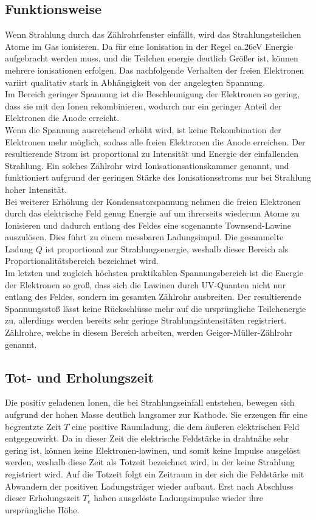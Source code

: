 \subsection{Funktionsweise}
Wenn Strahlung durch das Zählrohrfenster einfällt, wird das Strahlungsteilchen Atome im Gas ionisieren. Da für eine Ionisation in der Regel ca.26eV Energie aufgebracht werden muss, und die Teilchen energie deutlich Größer ist, können mehrere ionisationen erfolgen. Das nachfolgende Verhalten der freien Elektronen variirt qualitativ stark in Abhängigkeit von der angelegten Spannung. \\
Im Bereich geringer Spannung ist die Beschleunigung der Elektronen so gering, dass sie mit den Ionen rekombinieren, wodurch nur ein geringer Anteil der Elektronen die Anode erreicht.\\ Wenn die Spannung ausreichend erhöht wird, ist keine Rekombination der Elektronen mehr möglich, sodass alle freien Elektronen die Anode erreichen. Der resultierende Strom ist proportional zu Intensität und Energie der einfallenden Strahlung. Ein solches Zählrohr wird Ionisationsationskammer genannt, und funktioniert aufgrund der geringen Stärke des Ionisationsstroms nur bei Strahlung hoher Intensität. \\
Bei weiterer Erhöhung der Kondensatorspannung nehmen die freien Elektronen durch das elektrische Feld genug Energie auf um ihrerseits wiederum Atome zu Ionisieren und dadurch entlang des Feldes eine sogenannte Townsend-Lawine auszulösen. Dies führt zu einem messbaren Ladungsimpul. Die gesammelte Ladung $Q$ ist proportional zur Strahlungsenergie, weshalb dieser Bereich als Proportionalitätsbereich bezeichnet wird. \\ Im letzten und zugleich höchsten praktikablen Spannungsbereich ist die Energie der Elektronen so groß, dass sich die Lawinen durch UV-Quanten nicht nur entlang des Feldes, sondern im gesamten Zählrohr ausbreiten. Der resultierende Spannungsstoß lässt keine Rückschlüsse mehr auf die ursprüngliche Teilchenergie zu, allerdings werden bereits sehr geringe Strahlungsintensitäten registriert. Zählrohre, welche in diesem Bereich arbeiten, werden Geiger-Müller-Zählrohr genannt.
\subsection{Tot- und Erholungszeit}
Die positiv geladenen Ionen, die bei Strahlungseinfall entstehen, bewegen sich aufgrund der hohen Masse deutlich langsamer zur Kathode. Sie erzeugen für eine begrentzte Zeit $T$ eine positive Raumladung, die dem äußeren elektrischen Feld entgegenwirkt. Da in dieser Zeit die elektrische Feldstärke in drahtnähe sehr gering ist, können keine Elektronen-lawinen, und somit keine Impulse ausgelöst werden, weshalb diese Zeit als Totzeit bezeichnet wird, in der keine Strahlung registriert wird. Auf die Totzeit folgt ein Zeitraum in der sich die Feldstärke mit Abwandern der positiven Ladungsträger wieder aufbaut. Erst nach Abschluss dieser Erholungszeit $T_e$ haben ausgelöste Ladungsimpulse wieder ihre ursprüngliche Höhe.
